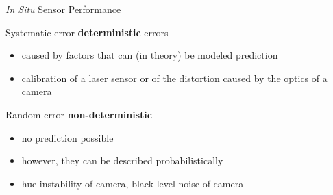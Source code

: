 \documentclass[compress]{beamer}
\begin{document}
\begin{frame}{\emph{In Situ} Sensor Performance}


    Systematic error \Rightarrow \textbf{deterministic} errors

    \begin{itemize}
        \item
              caused by factors that can (in theory) be modeled \rightarrow
              prediction
        \item
              \eg calibration of a laser sensor or of the distortion caused by the
              optics of a camera
    \end{itemize}

    Random error \Rightarrow \textbf{non-deterministic}

    \begin{itemize}

        \item
              no prediction possible
        \item
              however, they can be described probabilistically
        \item
              \eg hue instability of camera, black level noise of camera
    \end{itemize}

\end{frame}
\end{document}
